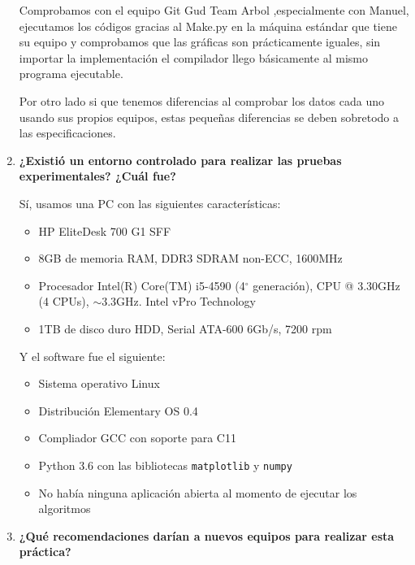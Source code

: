 \documentclass[12pt, fleqn]{report}                             %
\theoremstyle{break}                                            %
\begin{document}
\begin{enumerate}
	            
	            Comprobamos con el equipo Git Gud Team Arbol ,especialmente con Manuel, ejecutamos los códigos gracias al Make.py en la máquina estándar que tiene su equipo y comprobamos que las gráficas son prácticamente iguales, sin importar la implementación el compilador llego básicamente al mismo programa ejecutable.
	            
	            Por otro lado si que tenemos diferencias al comprobar los datos cada uno usando sus propios equipos, estas pequeñas diferencias se deben sobretodo a las especificaciones.
	                
	            
	            \item \textbf{¿Existió un entorno controlado para realizar las pruebas experimentales? ¿Cuál fue?}
	            
	                Sí, usamos una PC con las siguientes características:
	                \begin{itemize}\setlength\itemsep{0em}
	                    \item HP EliteDesk 700 G1 SFF
	                    \item 8GB de memoria RAM, DDR3 SDRAM non-ECC, 1600MHz
	                    \item Procesador Intel(R) Core(TM) i5-4590 (4$^\circ$ generación), CPU @ 3.30GHz (4 CPUs), $\sim$3.3GHz. Intel vPro Technology
	                    \item 1TB de disco duro HDD, Serial ATA-600 6Gb/s, 7200 rpm
	                \end{itemize}
	                
	                Y el software fue el siguiente:
	                \begin{itemize}\setlength\itemsep{0em}
	                    \item Sistema operativo Linux
	                    \item Distribución Elementary OS 0.4
	                    \item Compliador GCC con soporte para C11
	                    \item Python 3.6 con las bibliotecas \texttt{matplotlib} y \texttt{numpy}
	                    \item No había ninguna aplicación abierta al momento de ejecutar los algoritmos
	                \end{itemize}
	            
	            \item \textbf{¿Qué recomendaciones darían a nuevos equipos para realizar esta práctica?}
	            

\end{enumerate}
\end{document}

